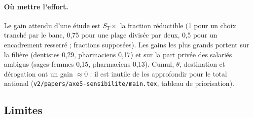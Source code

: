 \paragraph{Où mettre l'effort.} Le gain attendu d'une étude est $S_T \times$ la fraction réductible (1 pour un choix
tranché par le banc, 0,75 pour une plage divisée par deux, 0,5 pour un encadrement resserré ; fractions
supposées\suppose{}). Les gains les plus grands portent sur la filière (dentistes 0,29, pharmaciens
0,17\derive{}) et sur la part privée des salariés ambigus (sages-femmes 0,15, pharmaciens 0,13\derive{}). Cumul,
$\theta$, destination et dérogation ont un gain $\approx 0$ : il est inutile de les approfondir pour le total national
(\texttt{v2/papers/axe5-sensibilite/main.tex}, tableau de priorisation).

\subsection{Limites}\label{sen:limites}

